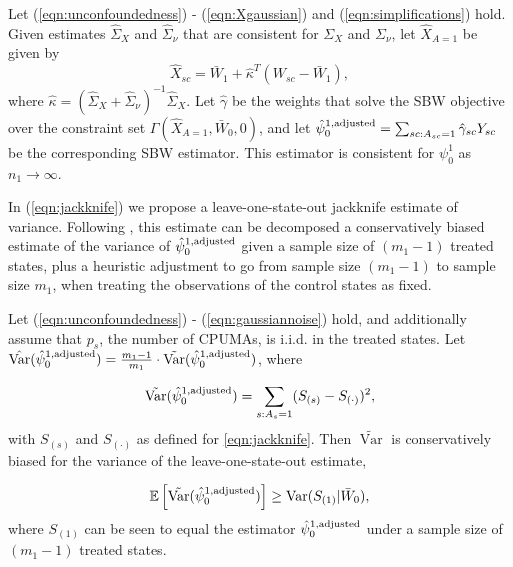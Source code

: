 \begin{proposition}\label{cl3}
Let (\ref{eqn:unconfoundedness}) - (\ref{eqn:Xgaussian}) and (\ref{eqn:simplifications}) hold. Given estimates $\hat{\Sigma}_X$ and $\hat{\Sigma}_\nu$ that are consistent for $\Sigma_X$ and $\Sigma_\nu$, let $\hat{X}_{A=1}$ be given by 
\[ \hat{X}_{sc} = \bar{W}_1 + \hat{\kappa}^T(W_{sc} - \bar{W}_1), \]
where $\hat{\kappa} = (\hat{\Sigma}_X + \hat{\Sigma}_{\nu})^{-1} \hat{\Sigma}_X$. Let $\hat{\gamma}$ be the weights that solve the SBW objective over the constraint set $\Gamma(\hat{X}_{A=1}, \bar{W}_0, 0)$, and let $\hat{\psi}^{1, \textup{adjusted}}_0 = \sum_{sc: A_{sc} = 1} \hat{\gamma}_{sc} Y_{sc}$ be the corresponding SBW estimator. This estimator is consistent for $\psi_0^1$ as $n_1 \to \infty$.
\end{proposition}

In (\ref{eqn:jackknife}) we propose a leave-one-state-out jackknife estimate of variance. Following 
\cite{efron1981jackknife}, this estimate can be decomposed a conservatively biased estimate of the variance of $\hat{\psi}_0^{1, \textup{adjusted}}$ given a sample size of $(m_1-1)$ treated states, plus a heuristic adjustment to go from sample size $(m_1-1)$ to sample size $m_1$, when treating the observations of the control states as fixed.

\begin{proposition}\label{prop:jackknife}
Let (\ref{eqn:unconfoundedness}) - (\ref{eqn:gaussiannoise}) hold, and additionally assume that $p_s$, the number of CPUMAs, is i.i.d. in the treated states. Let $\hat{\operatorname{Var}}(\hat{\psi}_0^{1, \textup{adjusted}}) = \frac{m_1-1}{m_1} \cdot \tilde{\operatorname{Var}}(\hat{\psi}_0^{1, \textup{adjusted}})$, where

\begin{equation} \label{eqn:prop.jackknife}
\tilde{\operatorname{Var}}(\hat{\psi}_0^{1, \textup{adjusted}}) = \sum_{s:A_{s}=1} (S_{(s)} - S_{(\cdot)})^2,
\end{equation}
with $S_{(s)}$ and $S_{(\cdot)}$ as defined for \eqref{eqn:jackknife}. Then $\tilde{\operatorname{Var}}$ is conservatively biased for the variance of the leave-one-state-out estimate,

\[ \mathbb{E}\left[ \tilde{\operatorname{Var}}(\hat{\psi}_0^{1, \textup{adjusted}})\right] \geq \operatorname{Var}(S_{(1)} | \bar{W}_0),\]
where $S_{(1)}$ can be seen to equal the estimator $\hat{\psi}_0^{1,\textup{adjusted}}$ under a sample size of $(m_1-1)$ treated states.

\end{proposition}

